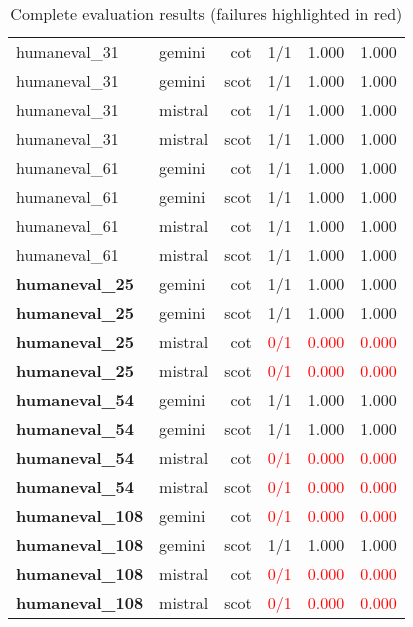 \documentclass[11pt]{article}
\begin{document}
\begin{table}[h]
\begin{tabular}{llrrrr}
humaneval\_31 & gemini & cot & 1/1 & 1.000 & 1.000 \\
humaneval\_31 & gemini & scot & 1/1 & 1.000 & 1.000 \\
humaneval\_31 & mistral & cot & 1/1 & 1.000 & 1.000 \\
humaneval\_31 & mistral & scot & 1/1 & 1.000 & 1.000 \\
\midrule
humaneval\_61 & gemini & cot & 1/1 & 1.000 & 1.000 \\
humaneval\_61 & gemini & scot & 1/1 & 1.000 & 1.000 \\
humaneval\_61 & mistral & cot & 1/1 & 1.000 & 1.000 \\
humaneval\_61 & mistral & scot & 1/1 & 1.000 & 1.000 \\
\midrule
\textbf{humaneval\_25} & gemini & cot & 1/1 & 1.000 & 1.000 \\
\textbf{humaneval\_25} & gemini & scot & 1/1 & 1.000 & 1.000 \\
\textbf{humaneval\_25} & mistral & cot & \textcolor{red}{0/1} & \textcolor{red}{0.000} & \textcolor{red}{0.000} \\
\textbf{humaneval\_25} & mistral & scot & \textcolor{red}{0/1} & \textcolor{red}{0.000} & \textcolor{red}{0.000} \\
\midrule
\textbf{humaneval\_54} & gemini & cot & 1/1 & 1.000 & 1.000 \\
\textbf{humaneval\_54} & gemini & scot & 1/1 & 1.000 & 1.000 \\
\textbf{humaneval\_54} & mistral & cot & \textcolor{red}{0/1} & \textcolor{red}{0.000} & \textcolor{red}{0.000} \\
\textbf{humaneval\_54} & mistral & scot & \textcolor{red}{0/1} & \textcolor{red}{0.000} & \textcolor{red}{0.000} \\
\midrule
\textbf{humaneval\_108} & gemini & cot & \textcolor{red}{0/1} & \textcolor{red}{0.000} & \textcolor{red}{0.000} \\
\textbf{humaneval\_108} & gemini & scot & 1/1 & 1.000 & 1.000 \\
\textbf{humaneval\_108} & mistral & cot & \textcolor{red}{0/1} & \textcolor{red}{0.000} & \textcolor{red}{0.000} \\
\textbf{humaneval\_108} & mistral & scot & \textcolor{red}{0/1} & \textcolor{red}{0.000} & \textcolor{red}{0.000} \\
\bottomrule
\end{tabular}
\caption{Complete evaluation results (failures highlighted in red)}
\label{tab:results}
\end{table}
\end{document}
